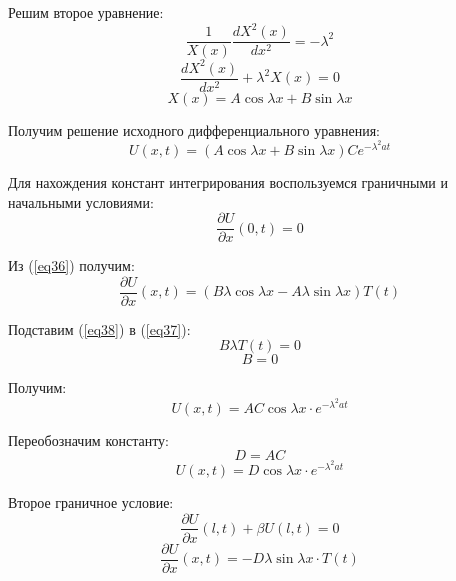Решим второе уравнение:
\begin{equation}
    \label{eq33}
    \frac{1}{X(x)} \frac{dX^2(x)}{dx^2} = - \lambda^2
\end{equation}
\begin{equation}
    \label{eq34}
    \frac{dX^2(x)}{dx^2} + \lambda^2 X(x) = 0
\end{equation}
\begin{equation}
    \label{eq35}
    X(x) = A \cos \lambda x + B \sin \lambda x
\end{equation}

Получим решение исходного дифференциального уравнения:
\begin{equation}
    \label{eq36}
    U(x, t) = (A \cos \lambda x + B \sin \lambda x)C e^{- \lambda^2 a t}
\end{equation}

Для нахождения констант интегрирования воспользуемся граничными и начальными условиями:
\begin{equation}
    \label{eq37}
    \frac{\partial U}{\partial x}(0, t) = 0
\end{equation}

Из (\ref{eq36}) получим:
\begin{equation}
    \label{eq38}
    \frac{\partial U}{\partial x}(x, t) = \left( B \lambda \cos \lambda x - A \lambda \sin \lambda x \right) T(t)
\end{equation}

Подставим (\ref{eq38}) в (\ref{eq37}):
\begin{equation}
    \label{eq39}
    B \lambda T(t) = 0
\end{equation}
\begin{equation}
    \label{eq40}
    B = 0
\end{equation}

Получим:
\begin{equation}
    \label{eq41}
    U(x, t) = A C \cos \lambda x \cdot e^{- \lambda^2 a t}
\end{equation}

Переобозначим константу:
\begin{equation}
    \label{eq42}
    D = AC
\end{equation}
\begin{equation}
    \label{eq43}
    U(x, t) = D \cos \lambda x \cdot e^{- \lambda^2 a t}
\end{equation}

Второе граничное условие:
\begin{equation}
    \label{eq44}
    \frac{\partial U}{\partial x} (l, t) + \beta U(l, t) = 0
\end{equation}
\begin{equation}
    \label{eq45}
    \frac{\partial U}{\partial x} (x, t) = - D \lambda \sin \lambda x \cdot T(t)
\end{equation}

